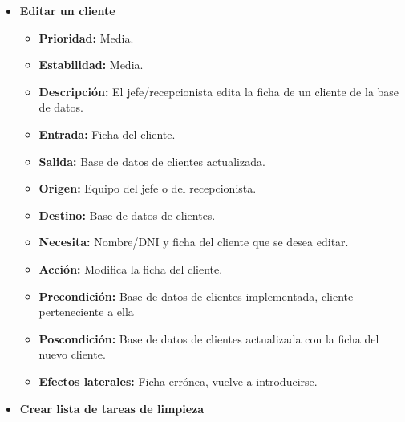 \documentclass[spanish,a4paper,12pt]{report}	%
\begin{document}
\begin{itemize}
\begin{itemize}
		\end{itemize}%

		\item \textbf{Editar un cliente}  %

			\begin{itemize}
				\item \textbf{Prioridad: }Media.
				\item \textbf{Estabilidad: }Media.
				\item \textbf{Descripción: }El jefe/recepcionista edita la ficha de un cliente de la base de datos.
				\item \textbf{Entrada: } Ficha del cliente.
				\item \textbf{Salida: }Base de datos de clientes actualizada.
				\item \textbf{Origen: }Equipo del jefe o del recepcionista.
				\item \textbf{Destino: }Base de datos de clientes. 
				\item \textbf{Necesita: }Nombre/DNI y ficha del cliente que se desea editar. 
				\item \textbf{Acción: }Modifica la ficha del cliente.
				\item \textbf{Precondición: }Base de datos de clientes implementada, cliente perteneciente a ella
				\item \textbf{Poscondición: }Base de datos de clientes actualizada con la ficha del nuevo cliente. 
				\item \textbf{Efectos laterales: } Ficha errónea, vuelve a introducirse.

		\end{itemize}%





	\item \textbf{Crear lista de tareas de limpieza} %


\end{itemize}
\end{document}

